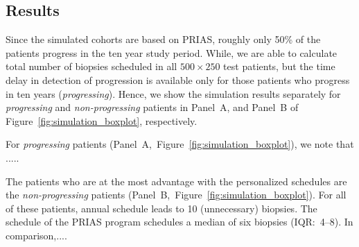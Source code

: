 \subsection{Results}
Since the simulated cohorts are based on PRIAS, roughly only 50\% of the patients progress in the ten year study period. While, we are able to calculate total number of biopsies scheduled in all $500 \times 250$ test patients, but the time delay in detection of progression is available only for those patients who progress in ten years (\textit{progressing}). Hence, we show the simulation results separately for \textit{progressing} and \textit{non-progressing} patients in Panel~A, and Panel~B of Figure~\ref{fig:simulation_boxplot}, respectively.

For \textit{progressing} patients (Panel~A,~Figure~\ref{fig:simulation_boxplot}), we note that .....

The patients who are at the most advantage with the personalized schedules are the \textit{non-progressing} patients (Panel~B,~Figure~\ref{fig:simulation_boxplot}). For all of these patients, annual schedule leads to 10 (unnecessary) biopsies. The schedule of the PRIAS program schedules a median of six biopsies (IQR:~4--8). In comparison,....


